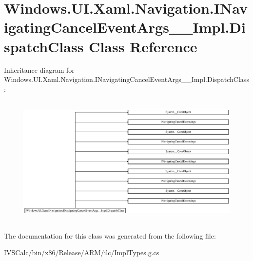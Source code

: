 \hypertarget{class_windows_1_1_u_i_1_1_xaml_1_1_navigation_1_1_i_navigating_cancel_event_args_____impl_1_1_dispatch_class}{}\section{Windows.\+U\+I.\+Xaml.\+Navigation.\+I\+Navigating\+Cancel\+Event\+Args\+\_\+\+\_\+\+Impl.\+Dispatch\+Class Class Reference}
\label{class_windows_1_1_u_i_1_1_xaml_1_1_navigation_1_1_i_navigating_cancel_event_args_____impl_1_1_dispatch_class}
Inheritance diagram for Windows.\+U\+I.\+Xaml.\+Navigation.\+I\+Navigating\+Cancel\+Event\+Args\+\_\+\+\_\+\+Impl.\+Dispatch\+Class\+:\begin{figure}[H]
\begin{center}
\leavevmode
\includegraphics[height=6.595289cm]{class_windows_1_1_u_i_1_1_xaml_1_1_navigation_1_1_i_navigating_cancel_event_args_____impl_1_1_dispatch_class}
\end{center}
\end{figure}


The documentation for this class was generated from the following file\+:\begin{DoxyCompactItemize}
\item 
I\+V\+S\+Calc/bin/x86/\+Release/\+A\+R\+M/ilc/Impl\+Types.\+g.\+cs\end{DoxyCompactItemize}
